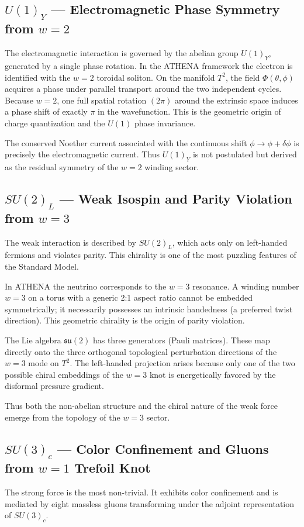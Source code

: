 \documentclass[11pt,a4paper]{article}
\begin{document}
\subsection{\(U(1)_Y\) — Electromagnetic Phase Symmetry from \(w = 2\)}
The electromagnetic interaction is governed by the abelian group \(U(1)_Y\), generated by a single phase rotation. In the ATHENA framework the electron is identified with the \(w = 2\) toroidal soliton. On the manifold \(T^2\), the field \(\Phi (\theta, \phi)\) acquires a phase under parallel transport around the two independent cycles. Because \(w = 2\), one full spatial rotation \((2\pi)\) around the extrinsic space induces a phase shift of exactly \(\pi\) in the wavefunction. This is the geometric origin of charge quantization and the \(U(1)\) phase invariance.

The conserved Noether current associated with the continuous shift \(\phi \rightarrow \phi +\delta \phi\) is precisely the electromagnetic current. Thus \(U(1)_Y\) is not postulated but derived as the residual symmetry of the \(w = 2\) winding sector.

\subsection{\(SU(2)_L\) — Weak Isospin and Parity Violation from \(w = 3\)}
The weak interaction is described by \(SU(2)_L\), which acts only on left-handed fermions and violates parity. This chirality is one of the most puzzling features of the Standard Model.

In ATHENA the neutrino corresponds to the \(w = 3\) resonance. A winding number \(w = 3\) on a torus with a generic 2:1 aspect ratio cannot be embedded symmetrically; it necessarily possesses an intrinsic handedness (a preferred twist direction). This geometric chirality is the origin of parity violation.

The Lie algebra \(\mathfrak{su}(2)\) has three generators (Pauli matrices). These map directly onto the three orthogonal topological perturbation directions of the \(w = 3\) mode on \(T^2\). The left-handed projection arises because only one of the two possible chiral embeddings of the \(w = 3\) knot is energetically favored by the disformal pressure gradient.

Thus both the non-abelian structure and the chiral nature of the weak force emerge from the topology of the \(w = 3\) sector.

\subsection{\(SU(3)_c\) — Color Confinement and Gluons from \(w = 1\) Trefoil Knot}
The strong force is the most non-trivial. It exhibits color confinement and is mediated by eight massless gluons transforming under the adjoint representation of \(SU(3)_c\).
\end{document}
